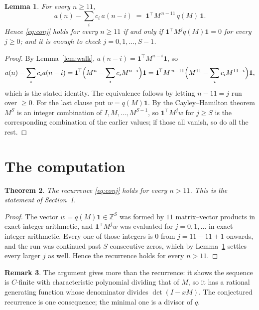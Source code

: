 \documentclass[11pt,a4paper]{article}
\theoremstyle{plain}
\newtheorem{theorem}{Theorem}
\newtheorem{lemma}[theorem]{Lemma}
\theoremstyle{definition}
\newtheorem{remark}[theorem]{Remark}
\begin{document}
\begin{lemma}\label{lem:crit}
For every $n\ge11$,
\[
a(n)-\sum_i c_i\,a(n-i)\;=\;\mathbf{1}^{\!\top}M^{\,n-11}\,q(M)\,\mathbf{1} .
\]
Hence \eqref{eq:conj} holds for every $n\ge11$ if and only if
$\mathbf{1}^{\!\top}M^{j}q(M)\mathbf{1}=0$ for every $j\ge0$; and it is enough to
check $j=0,1,\dots,S-1$.
\end{lemma}

\begin{proof}
By Lemma~\ref{lem:walk}, $a(n-i)=\mathbf{1}^{\!\top}M^{n-i}\mathbf{1}$, so
\[
a(n)-\sum_i c_i a(n-i)
=\mathbf{1}^{\!\top}\Bigl(M^{n}-\sum_i c_i M^{n-i}\Bigr)\mathbf{1}
=\mathbf{1}^{\!\top}M^{\,n-11}\Bigl(M^{11}-\sum_i c_i M^{11-i}\Bigr)\mathbf{1},
\]
which is the stated identity. The equivalence follows by letting $n-11=j$ run over
$\ge0$. For the last clause put $w=q(M)\mathbf{1}$. By the Cayley--Hamilton theorem
$M^{S}$ is an integer combination of $I,M,\dots,M^{S-1}$, so
$\mathbf{1}^{\!\top}M^{j}w$ for $j\ge S$ is the corresponding combination of the
earlier values; if those all vanish, so do all the rest.
\end{proof}

\section{The computation}

\begin{theorem}
The recurrence \eqref{eq:conj} holds for every $n>11$. This is the statement of
Section~1.
\end{theorem}

\begin{proof}
The vector $w=q(M)\mathbf{1}\in\mathbb{Z}^{S}$ was formed by $11$ matrix--vector
products in exact integer arithmetic, and $\mathbf{1}^{\!\top}M^{j}w$ was evaluated for
$j=0,1,\dots$ in exact integer arithmetic. Every one of those integers is $0$ from
$j=11-11+1$ onwards, and the run was continued past $S$ consecutive zeros, which by
Lemma~\ref{lem:crit} settles every larger $j$ as well. Hence the recurrence holds for
every $n>11$.
\end{proof}

\begin{remark}
The argument gives more than the recurrence: it shows the sequence is $C$-finite with
characteristic polynomial dividing that of $M$, so it has a rational generating function
whose denominator divides $\det(I-xM)$. The conjectured recurrence is one consequence; the
minimal one is a divisor of $q$.
\end{remark}
\end{document}
